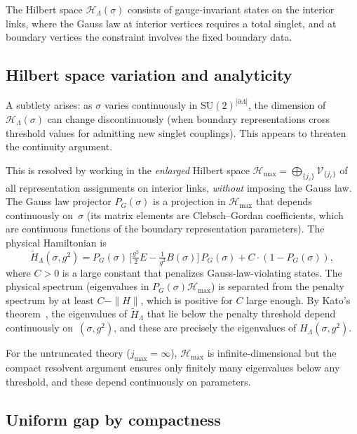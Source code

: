 \documentclass[12pt,a4paper]{article}
\begin{document}
The Hilbert space $\mathcal{H}_\Lambda(\sigma)$ consists of gauge-invariant states on the interior links, where the Gauss law at interior vertices requires a total singlet, and at boundary vertices the constraint involves the fixed boundary data.

\subsection{Hilbert space variation and analyticity}\label{sec:hilbert_variation}

A subtlety arises: as $\sigma$ varies continuously in $\mathrm{SU}(2)^{|\partial\Lambda|}$, the dimension of $\mathcal{H}_\Lambda(\sigma)$ can change discontinuously (when boundary representations cross threshold values for admitting new singlet couplings). This appears to threaten the continuity argument.

This is resolved by working in the \emph{enlarged} Hilbert space $\mathcal{H}_{\max}=\bigoplus_{\{j_\ell\}} \mathcal{V}_{\{j_\ell\}}$ of all representation assignments on interior links, \emph{without} imposing the Gauss law. The Gauss law projector $P_G(\sigma)$ is a projection in $\mathcal{H}_{\max}$ that depends continuously on~$\sigma$ (its matrix elements are Clebsch--Gordan coefficients, which are continuous functions of the boundary representation parameters). The physical Hamiltonian is
\begin{equation}
\tilde{H}_\Lambda(\sigma,g^2) = P_G(\sigma)\,\bigl[\tfrac{g^2}{2}E - \tfrac{1}{g^2}B(\sigma)\bigr]\,P_G(\sigma) + C\cdot(1-P_G(\sigma)),
\end{equation}
where $C>0$ is a large constant that penalizes Gauss-law-violating states. The physical spectrum (eigenvalues in $P_G(\sigma)\mathcal{H}_{\max}$) is separated from the penalty spectrum by at least $C-\|H\|$, which is positive for $C$ large enough. By Kato's theorem~\cite{Kato}, the eigenvalues of $\tilde{H}_\Lambda$ that lie below the penalty threshold depend continuously on~$(\sigma,g^2)$, and these are precisely the eigenvalues of $H_\Lambda(\sigma,g^2)$.

For the untruncated theory ($j_{\max}=\infty$), $\mathcal{H}_{\max}$ is infinite-dimensional but the compact resolvent argument ensures only finitely many eigenvalues below any threshold, and these depend continuously on parameters.

\subsection{Uniform gap by compactness}
\end{document}
